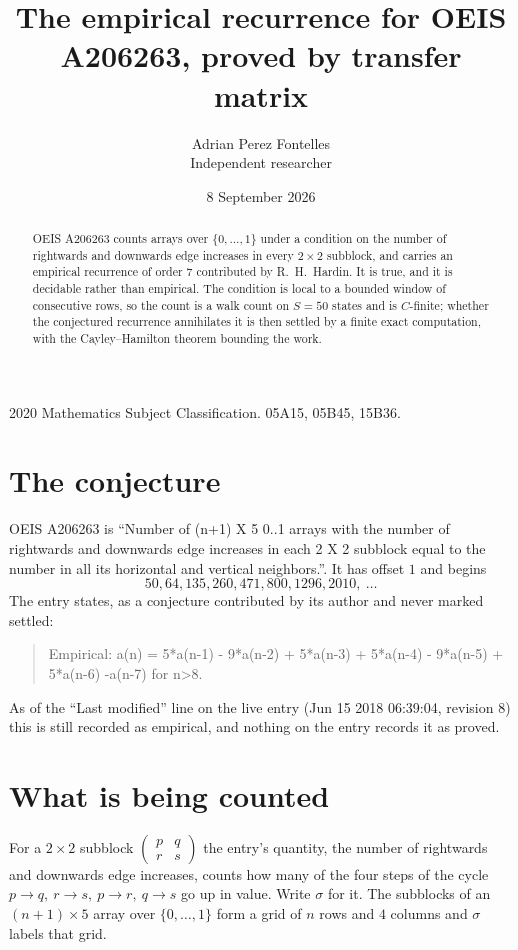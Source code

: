 \documentclass[11pt,a4paper]{article}
\title{The empirical recurrence for OEIS A206263, proved by transfer matrix}
\author{Adrian Perez Fontelles\\ \small Independent researcher}
\date{8 September 2026}
\theoremstyle{plain}
\theoremstyle{definition}
\begin{document}
\maketitle

\begin{abstract}
OEIS A206263 counts arrays over $\{0,\dots,1\}$ under a condition on the number of rightwards and downwards edge increases
in every $2\times2$ subblock, and carries an empirical recurrence of order $7$ contributed by
R.~H.~Hardin. It is true, and it is decidable rather than empirical. The condition is local to
a bounded window of consecutive rows, so the count is a walk count on $S=50$ states and is
$C$-finite; whether the conjectured recurrence annihilates it is then settled by a finite exact
computation, with the Cayley--Hamilton theorem bounding the work.
\end{abstract}

\noindent\small 2020 Mathematics Subject Classification. 05A15, 05B45, 15B36.\normalsize

\section{The conjecture}

OEIS A206263 is ``Number of (n+1) X 5 0..1 arrays with the number of rightwards and downwards edge increases in each 2 X 2 subblock equal to the number in all its horizontal and vertical neighbors.''. It has offset $1$ and begins
\[
50, 64, 135, 260, 471, 800, 1296, 2010,\ \dots
\]
The entry states, as a conjecture contributed by its author and never marked settled:
\begin{quote}
Empirical: a(n) = 5*a(n-1) - 9*a(n-2) + 5*a(n-3) + 5*a(n-4) - 9*a(n-5) + 5*a(n-6) -a(n-7) for n>8.
\end{quote}
As of the ``Last modified'' line on the live entry (Jun 15 2018 06:39:04, revision 8) this is still
recorded as empirical, and nothing on the entry records it as proved.

\section{What is being counted}

For a $2\times2$ subblock $\begin{pmatrix}p&q\\r&s\end{pmatrix}$ the
entry's quantity, the number of rightwards and downwards edge increases, counts how many of the four steps of the cycle $p\to q,\ r\to s,\ p\to r,\ q\to s$ go up in value. Write $\sigma$ for it. The subblocks of an
$(n+1)\times5$ array over $\{0,\dots,1\}$ form a grid of $n$ rows and $4$
columns and $\sigma$ labels that grid.
\end{document}
